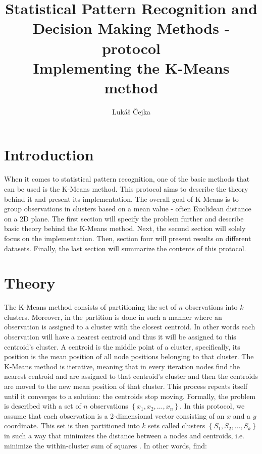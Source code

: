 \documentclass[a4paper]{article}
\newcommand{\code}{\texttt}
\newcommand{\Author}{Lukáš Čejka}
\begin{document}
\title{Statistical Pattern Recognition and Decision Making Methods
	 - protocol \\
\textbf{Implementing the K-Means method}}
\author{\Author}
\maketitle

\renewcommand{\code}[1]{\colorbox{codegray}{\texttt{#1}}}

{
	\hypersetup{linkcolor=black}
	\tableofcontents
}


\section{Introduction}
When it comes to statistical pattern recognition, one of the basic methods that can be used is the K-Means method. This protocol aims to describe the theory behind it and present its implementation. The overall goal of K-Means is to group observations in clusters based on a mean value - often Euclidean distance on a 2D plane.\newline
The first section will specify the problem further and describe basic theory behind the K-Means method. Next, the second section will solely focus on the implementation. Then, section four will present results on different datasets. Finally, the last section will summarize the contents of this protocol.




\section{Theory}\label{section:theory}
The K-Means method consists of partitioning the set of $ n $ observations into $ k $ clusters. Moreover, in the partition is done in such a manner where an observation is assigned to a cluster with the closest centroid. In other words each observation will have a nearest centroid and thus it will be assigned to this centroid's cluster. A centroid is the middle point of a cluster, specifically, its position is the mean position of all node positions belonging to that cluster.\newline
The K-Means method is iterative, meaning that in every iteration nodes find the nearest centroid and are assigned to that centroid's cluster and then the centroids are moved to the new mean position of that cluster. This process repeats itself until it converges to a solution: the centroids stop moving.
\newline
Formally, the problem is described with a set of $ n $ observations $ \left\{x_1, x_2, \ldots, x_n\right\} $. In this protocol, we assume that each observation is a 2-dimensional vector consisting of an $ x $ and a $ y $ coordinate. This set is then partitioned into $ k $ sets called clusters $ \left\{S_1, S_2, \ldots, S_k\right\} $ in such a way that minimizes the distance between a nodes and centroids, i.e. minimize the within-cluster sum of squares \cite{IgcWaW8BViU6zM4T}. In other words, find:
\end{document}
